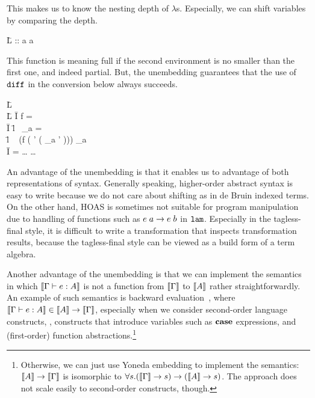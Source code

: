 \documentclass{article}
\let\cite=\citep
\theoremstyle{definition}
\begin{document}
This makes us to know the nesting depth of $\lambda$s. Especially, we can shift variables by comparing the depth. 
\begin{code}
\=L  ::  \A {} \to {} \A {} \to {} \A a \A {} \to {} \A a \A {}
\end{code}
This function is meaning full if the second environment is no smaller than the first one, and indeed partial. But, the unembedding guarantees 
that the use of $\texttt{diff}$ in the conversion below always succeeds. 
\begin{code}
\=L ~ \A {}~ \WHERE \\
\=L \quad {} 
 \=I  \A f =  \DOLLAR \lambda \gamma \to {} \DOLLAR  \\
 \=I \qquad {} 
      \=l \LET~\gamma_a =  \A {} \A \gamma \\
      \=l \IN~  \A (f \A ( \DOLLAR \lambda \gamma' \to {} \A ( \A \gamma_a \A \gamma' \A {}))) \A \gamma_a\\
 \=I  = \dots {} \dots 
\end{code}

An advantage of the unembedding is that it enables us to advantage of both representations of syntax. Generally speaking, higher-order abstract syntax is easy to write because we do not care about shifting as in de Bruin indexed terms. On the other hand, HOAS is sometimes not suitable for program manipulation due to handling of functions such as $e \; a \to e \; b$ in $\texttt{lam}$. Especially in the tagless-final style, it is difficult to write a transformation that inspects transformation results, because the tagless-final style can be viewed as a build form of a term algebra. 

Another advantage of the unembedding is that we can implement the semantics in which $\sem{ \Gamma \vdash e : A }$ is not a function from $\sem{\Gamma}$ to $\sem{A}$ rather straightforwardly. An example of such semantics is backward evaluation~\cite{MatsudaW18haskell}, where $\sem{ \Gamma \vdash e : A } \in \sem{A} \to \sem{\Gamma}$, especially when we consider second-order language constructs, \ie, constructs that introduce variables such as $\mathbf{case}$ expressions, and (first-order) function abstractions.\footnote{Otherwise, we can just use Yoneda embedding to implement the semantics: 
$\sem{A} \to \sem{\Gamma}$ is isomorphic to $\forall s. (\sem{\Gamma} \to s) \to (\sem{A} \to s)$. The approach does not scale easily to second-order constructs, though. }
\end{document}
